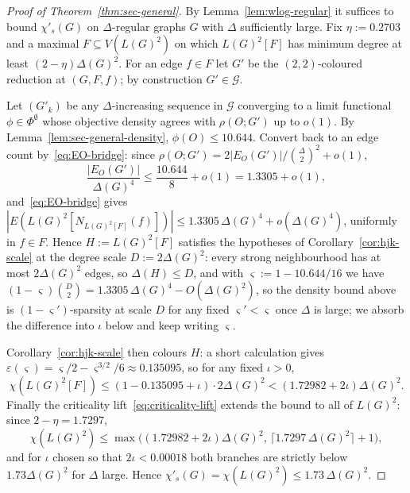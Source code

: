 \documentclass[10pt,a4paper]{amsart}
\newcommand{\Gcl}{\mathcal{G}}
\begin{document}
\begin{proof}[Proof of Theorem~\ref{thm:sec-general}]
By Lemma~\ref{lem:wlog-regular} it suffices to bound $\chi'_s(G)$ on
$\Delta$-regular graphs $G$ with $\Delta$ sufficiently large. Fix
$\eta := 0.2703$ and a maximal $F \subseteq V(L(G)^2)$ on which
$L(G)^2[F]$ has minimum degree at least $(2 - \eta)\Delta(G)^2$. For
an edge $f \in F$ let $G'$ be the $(2,2)$-coloured reduction at
$(G, F, f)$; by construction $G' \in \Gcl$.

Let $(G'_k)$ be any $\Delta$-increasing sequence in $\Gcl$ converging
to a limit functional $\phi \in \Phi^\emptyset$ whose objective density
agrees with $\rho(O; G')$ up to $o(1)$. By
Lemma~\ref{lem:sec-general-density}, $\phi(O) \leq 10.644$. Convert
back to an edge count by~\eqref{eq:EO-bridge}: since $\rho(O; G') =
2|E_O(G')|/\binom{\Delta}{2}^2 + o(1)$,
\[
\frac{|E_O(G')|}{\Delta(G)^4}
\leq \frac{10.644}{8} + o(1)
= 1.3305 + o(1),
\]
and~\eqref{eq:EO-bridge} gives
$|E(L(G)^2[N_{L(G)^2[F]}(f)])| \leq 1.3305\,\Delta(G)^4 +
o(\Delta(G)^4)$, uniformly in $f \in F$. Hence $H := L(G)^2[F]$
satisfies the hypotheses of Corollary~\ref{cor:hjk-scale} at the
degree scale $D := 2\Delta(G)^2$: every strong neighbourhood has at
most $2\Delta(G)^2$ edges, so $\Delta(H) \leq D$, and with
$\varsigma := 1 - 10.644/16$ we have $(1 - \varsigma)\binom{D}{2} =
1.3305\,\Delta(G)^4 - O(\Delta(G)^2)$, so the density bound above is
$(1 - \varsigma')$-sparsity at scale $D$ for any fixed
$\varsigma' < \varsigma$ once $\Delta$ is large; we absorb the
difference into $\iota$ below and keep writing $\varsigma$.

Corollary~\ref{cor:hjk-scale} then colours $H$: a short calculation
gives $\varepsilon(\varsigma) = \varsigma/2 - \varsigma^{3/2}/6
\approx 0.135095$, so for any fixed $\iota > 0$,
\[
\chi(L(G)^2[F])
\leq (1 - 0.135095 + \iota)\cdot 2\Delta(G)^2
< (1.72982 + 2\iota)\Delta(G)^2.
\]
Finally the criticality lift~\eqref{eq:criticality-lift} extends the
bound to all of $L(G)^2$: since $2 - \eta = 1.7297$,
\[
\chi(L(G)^2)
\leq \max\bigl((1.72982 + 2\iota)\Delta(G)^2,\,
\lceil 1.7297\,\Delta(G)^2\rceil + 1\bigr),
\]
and for $\iota$ chosen so that $2\iota < 0.00018$ both branches are
strictly below $1.73\Delta(G)^2$ for $\Delta$ large. Hence
$\chi'_s(G) = \chi(L(G)^2) \leq 1.73\,\Delta(G)^2$.
\end{proof}
\end{document}
